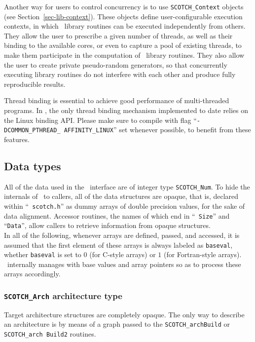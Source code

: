 Another way for users to control concurrency is to use
\texttt{SCOTCH\_\lbt Context} objects (see
Section~\ref{sec-lib-context}). These objects define user-configurable
execution contexts, in which \libscotch\ library routines can be
executed independently from others. They allow the user to prescribe a
given number of threads, as well as their binding to the available
cores, or even to capture a pool of existing threads, to make them
participate in the computation of \libscotch\ library routines. They
also allow the user to create private pseudo-random generators, so
that concurrently executing library routines do not interfere with
each other and produce fully reproducible results.

Thread binding is essential to achieve good performance of
multi-threaded programs. In \scotch, the only thread binding mechanism
implemented to date relies on the Linux binding API. Please make sure
to compile with flag ``\texttt{-DCOMMON\_\lbt PTHREAD\_\lbt
AFFINITY\_\lbt LINUX}'' set whenever possible, to benefit from these
features.

\subsection{Data types}

All of the data used in the \libscotch\ interface are of integer type
{\tt SCOTCH\_Num}. To hide the internals of \scotch\ to callers, all
of the data structures are opaque, that is, declared within ``{\tt
scotch.h}'' as dummy arrays of double precision values, for the sake of
data alignment. Accessor routines, the names of which end in ``{\tt
Size}'' and ``{\tt Data}'', allow callers to retrieve information from
opaque structures.
\\

In all of the following, whenever arrays are defined, passed, and
accessed, it is assumed that the first element of these arrays is
always labeled as {\tt baseval}, whether {\tt baseval} is set to $0$
(for C-style arrays) or $1$ (for Fortran-style arrays). \scotch\
internally manages with base values and array pointers so as to
process these arrays accordingly.

\subsubsection{\texttt{SCOTCH\_\lbt Arch} architecture type}

Target architecture structures are completely opaque. The only way
to describe an architecture is by means of a graph passed to the
{\tt SCOTCH\_\lbt arch\lbt Build} or {\tt SCOTCH\_\lbt arch\lbt
Build2} routines.

